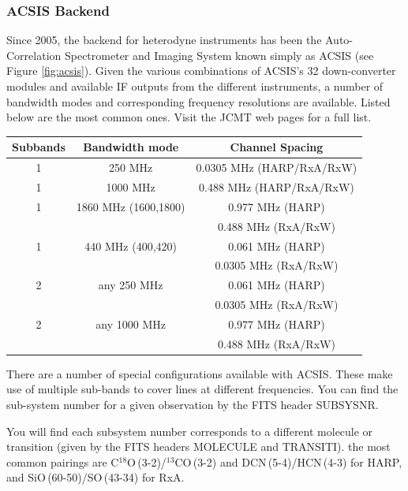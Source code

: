 \documentclass[twoside,11pt]{article}
\renewcommand{\_}{\texttt{\symbol{95}}}
\begin{document}
\subsubsection{ACSIS Backend}
Since 2005, the backend for heterodyne instruments has been the Auto-Correlation Spectrometer and Imaging System known simply as ACSIS (see Figure \ref{fig:acsis}). Given the various combinations of ACSIS's 32 down-converter modules and available IF outputs from the different instruments, a number of bandwidth modes and corresponding frequency resolutions are available. Listed below are the most common ones. Visit the JCMT web pages for a full list.
\newpage
\begin{table}[h!]
\begin{center}
\begin{tabular}{c|c|c}
\hline
\textbf{Subbands} & \textbf{Bandwidth mode}&	\textbf{Channel Spacing}\\
\hline
1 & 250 MHz &	0.0305 MHz (HARP/RxA/RxW)\\
1 &1000 MHz&	0.488 MHz (HARP/RxA/RxW)\\
1 &1860 MHz (1600,1800) &	0.977 MHz (HARP) \\
 & & 0.488 MHz (RxA/RxW)\\
1 &440  MHz (400,420) &	0.061 MHz (HARP) \\
 & &	 0.0305 MHz (RxA/RxW)\\
\hline
2  & any 250 MHz&	0.061 MHz (HARP)\\
  &&	 0.0305 MHz (RxA/RxW)\\
2 &any 1000 MHz&	0.977 MHz (HARP) \\
 && 0.488 MHz (RxA/RxW)\\
\hline
\end{tabular}
\end{center}
\end{table}
There are a number of special configurations available with ACSIS. These make use of multiple sub-bands to cover lines at different frequencies.  You can find the sub-system number for a given observation by the FITS header SUBSYSNR. 

You will find each subsystem number corresponds to a different molecule or transition (given by the FITS headers MOLECULE and TRANSITI). the most common pairings are C$^{18}$O\,(3-2)/$^{13}$CO\,(3-2) and DCN\,(5-4)/HCN\,(4-3)  for HARP, and SiO\,(60-50)/SO\,(43-34) for RxA.
\end{document}
